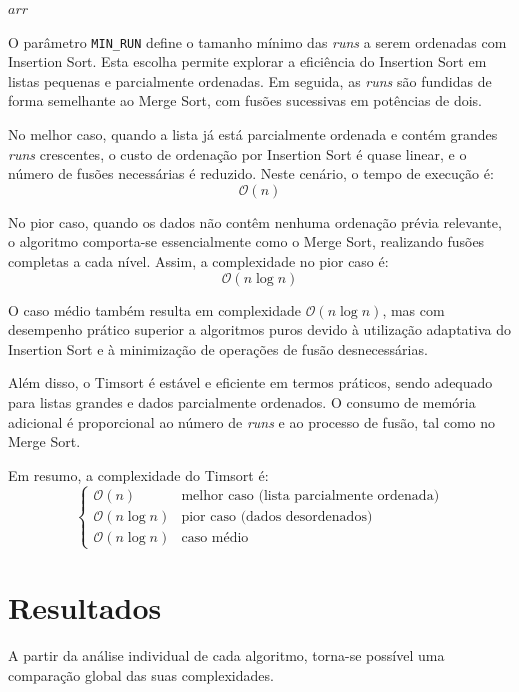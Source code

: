 \documentclass[conference]{IEEEtran}
\begin{document}
\begin{algorithm}[H]
\begin{algorithmic}[1]
            \State \Return $arr$
        \EndFunction
    
        \State {}
    \end{algorithmic}
\end{algorithm}

O parâmetro \texttt{MIN\_RUN} define o tamanho mínimo das \textit{runs} a serem ordenadas com Insertion Sort. Esta escolha permite explorar a eficiência do Insertion Sort em listas pequenas e parcialmente ordenadas. Em seguida, as \textit{runs} são fundidas de forma semelhante ao Merge Sort, com fusões sucessivas em potências de dois.

No melhor caso, quando a lista já está parcialmente ordenada e contém grandes \textit{runs} crescentes, o custo de ordenação por Insertion Sort é quase linear, e o número de fusões necessárias é reduzido. Neste cenário, o tempo de execução é:
\[
\mathcal{O}(n)
\]

No pior caso, quando os dados não contêm nenhuma ordenação prévia relevante, o algoritmo comporta-se essencialmente como o Merge Sort, realizando fusões completas a cada nível. Assim, a complexidade no pior caso é:
\[
\mathcal{O}(n \log n)
\]

O caso médio também resulta em complexidade \(\mathcal{O}(n \log n)\), mas com desempenho prático superior a algoritmos puros devido à utilização adaptativa do Insertion Sort e à minimização de operações de fusão desnecessárias.

Além disso, o Timsort é estável e eficiente em termos práticos, sendo adequado para listas grandes e dados parcialmente ordenados. O consumo de memória adicional é proporcional ao número de \textit{runs} e ao processo de fusão, tal como no Merge Sort.

Em resumo, a complexidade do Timsort é:
\[
\begin{cases}
\mathcal{O}(n) & \text{melhor caso (lista parcialmente ordenada)} \\
\mathcal{O}(n \log n) & \text{pior caso (dados desordenados)} \\
\mathcal{O}(n \log n) & \text{caso médio}
\end{cases}
\]

\section{Resultados}

A partir da análise individual de cada algoritmo, torna-se possível uma comparação global das suas complexidades.
\end{document}
